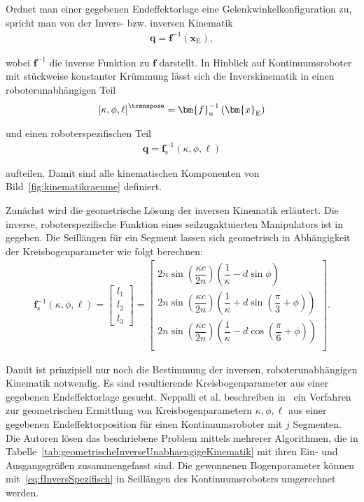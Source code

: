 Ordnet man einer gegebenen Endeffektorlage eine Gelenkwinkelkonfiguration zu, spricht man von der Invers- bzw. inversen Kinematik
\begin{align}
\bm{q}  = \bm{f}^{-1} \left( \bm{x}_{\mathrm{E}} \right), 
\label{eq:inverskinematik}
\end{align} 

wobei $\bm{f}^{-1}$ die inverse Funktion zu $\bm{f}$ darstellt. In Hinblick auf Kontinuumsroboter mit stückweise konstanter Krümmung lässt sich die Inverskinematik in einen roboterunabhängigen Teil
\begin{align}
\left[ \kappa, \phi, \ell \right]^\transpose = \bm{f}^{-1}_{\mathrm{u}} \left( \bm{x}_{\mathrm{E}} \right)
\end{align}

und einen roboterspezifischen Teil
\begin{align}
\bm{q} = \bm{f}^{-1}_{\mathrm{s}} \left( \kappa, \phi, \ell \right)
\end{align}

aufteilen. Damit sind alle kinematischen Komponenten von Bild~\ref{fig:kinematikraeume} definiert. \newline

Zunächst wird die geometrische Lösung der inversen Kinematik erläutert.
Die inverse, roboterspezifische Funktion eines seilzugaktuierten Manipulators ist in~\cite{JW06} gegeben. Die Seillängen für ein Segment lassen sich geometrisch in Abhängigkeit der Kreisbogenparameter wie folgt berechnen:
\begin{align}
\bm{f}^{-1}_{\mathrm{s}} \left( \kappa, \phi, \ell \right) = 
\begin{bmatrix}
l_1 \\ l_2 \\l_3 
\end{bmatrix} =
\begin{bmatrix}
2n \sin \left( \dfrac{\kappa c}{2n} \right) \left( \dfrac{1}{\kappa} - d \sin\phi \right) \\
2n \sin \left( \dfrac{\kappa c}{2n} \right) \left( \dfrac{1}{\kappa} + d \sin \left(\dfrac{\pi}{3} + \phi  \right) \right) \\
2n \sin \left( \dfrac{\kappa c}{2n} \right) \left( \dfrac{1}{\kappa} - d \cos \left(\dfrac{\pi}{6} + \phi  \right) \right) \\
\end{bmatrix}.
\label{eq:fInversSpezifisch}
\end{align}

Damit ist prinzipiell nur noch die Bestimmung der inversen, roboterunabhängigen Kinematik notwendig. Es sind resultierende Kreisbogenparameter aus einer gegebenen Endeffektorlage gesucht. Neppalli et al. beschreiben in~\cite{NCJW09} ein Verfahren zur geometrischen Ermittlung von Kreisbogenparametern $\kappa, \phi, \ell$ aus einer gegebenen Endeffektorposition für einen Kontinuumsroboter mit $j$ Segmenten. Die Autoren lösen das beschriebene Problem mittels mehrerer Algorithmen, die in Tabelle~\ref{tab:geometrischeInverseUnabhaengigeKinematik} mit ihren Ein- und Ausgangsgrößen zusammengefasst sind. Die gewonnenen Bogenparameter können mit~\eqref{eq:fInversSpezifisch} in Seillängen des Kontinuumsroboters umgerechnet werden. 

